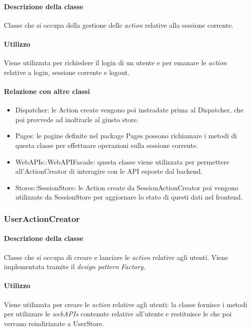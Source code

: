\paragraph*{Descrizione della classe}
Classe che si occupa della gestione delle \textit{action} relative alla sessione corrente.

\paragraph*{Utilizzo}
Viene utilizzata per richiedere il login di un utente e per emanare le \textit{action} relative a login, sessione corrente e logout.

\paragraph*{Relazione con altre classi}
\begin{itemize}
\item Dispatcher: le Action create vengono poi instradate prima al Dispatcher, che poi provvede ad inoltrarle al giusto store.
\item Pages: le pagine definite nel package Pages possono richiamare i metodi di questa classe per effettuare operazioni sulla sessione corrente.
\item WebAPIs::WebAPIFacade: questa classe viene utilizzata per permettere all'ActionCreator di interagire con le API esposte dal backend.
\item Stores::SessionStore: le Action create da SessionActionCreator poi vengono utilizzate da SessionStore per aggiornare lo stato di questi dati nel frontend.
\end{itemize}

\subsubsection{UserActionCreator}
\paragraph*{Descrizione della classe}
Classe che si occupa di creare e lanciare le \textit{action} relative agli utenti. Viene implementata tramite il \textit{design pattern} \textit{Factory}.
\paragraph*{Utilizzo}
Viene utilizzata per creare le \textit{action} relative agli utenti: la classe fornisce i metodi per utilizzare le \textit{webAPIs} contenute relative all'utente e restituisce le  che poi verrano reindirizzate a UserStore.


